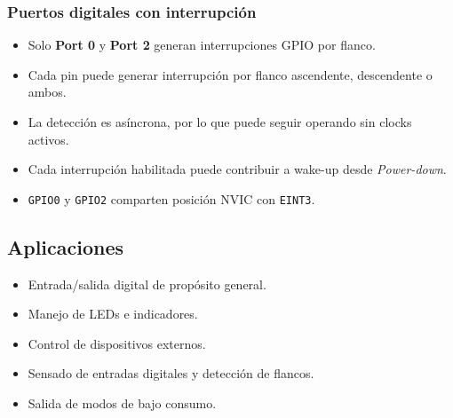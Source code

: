 \subsubsection{Puertos digitales con interrupción}
\begin{itemize}
  \item Solo \textbf{Port 0} y \textbf{Port 2} generan interrupciones GPIO por flanco.
  \item Cada pin puede generar interrupción por flanco ascendente, descendente o ambos.
  \item La detección es asíncrona, por lo que puede seguir operando sin clocks activos.
  \item Cada interrupción habilitada puede contribuir a wake-up desde \textit{Power-down}.
  \item \texttt{GPIO0} y \texttt{GPIO2} comparten posición NVIC con \texttt{EINT3}.
\end{itemize}

\subsection{Aplicaciones}
\begin{itemize}
  \item Entrada/salida digital de propósito general.
  \item Manejo de LEDs e indicadores.
  \item Control de dispositivos externos.
  \item Sensado de entradas digitales y detección de flancos.
  \item Salida de modos de bajo consumo.
\end{itemize}

